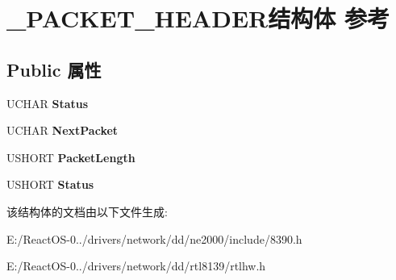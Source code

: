 \hypertarget{struct___p_a_c_k_e_t___h_e_a_d_e_r}{}\section{\+\_\+\+P\+A\+C\+K\+E\+T\+\_\+\+H\+E\+A\+D\+E\+R结构体 参考}
\label{struct___p_a_c_k_e_t___h_e_a_d_e_r}
\subsection*{Public 属性}
\begin{DoxyCompactItemize}
\item 
\mbox{\label{struct___p_a_c_k_e_t___h_e_a_d_e_r_a5f7161b884d3a2d5e34f9037e7b734aa}} 
U\+C\+H\+AR {\bfseries Status}
\item 
\mbox{\label{struct___p_a_c_k_e_t___h_e_a_d_e_r_a58d814862ab8f1888c532135e35ee531}} 
U\+C\+H\+AR {\bfseries Next\+Packet}
\item 
\mbox{\label{struct___p_a_c_k_e_t___h_e_a_d_e_r_a05f15ea348ef5a7e45efb9337594085d}} 
U\+S\+H\+O\+RT {\bfseries Packet\+Length}
\item 
\mbox{\label{struct___p_a_c_k_e_t___h_e_a_d_e_r_ae9fbddfe44e35ce5465a7f968dd4fa0c}} 
U\+S\+H\+O\+RT {\bfseries Status}
\end{DoxyCompactItemize}


该结构体的文档由以下文件生成\+:\begin{DoxyCompactItemize}
\item 
E\+:/\+React\+O\+S-\/0../drivers/network/dd/ne2000/include/8390.\+h\item 
E\+:/\+React\+O\+S-\/0../drivers/network/dd/rtl8139/rtlhw.\+h\end{DoxyCompactItemize}
